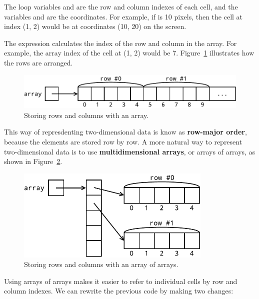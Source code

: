 The loop variables  and  are the row and column indexes of each cell, and the variables  and  are the coordinates.
For example, if  is 10 pixels, then the cell at index (1, 2) would be at coordinates (10, 20) on the screen.

The expression  calculates the index of the row and column in the array.
For example, the array index of the cell at (1, 2) would be 7.
Figure~\ref{fig:1D-array} illustrates how the rows are arranged.

\begin{figure}[!ht]
\begin{center}
\includegraphics[width=366pt]{figs/1D-array.pdf}
\caption{Storing rows and columns with an array.}
\label{fig:1D-array}
\end{center}
\end{figure}


This way of represdenting two-dimensional data is know as {\bf row-major order}, because the elements are stored row by row.
A more natural way to represent two-dimensional data is to use {\bf multidimensional arrays}, or arrays of arrays, as shown in Figure~\ref{fig:2D-array}.

\begin{figure}[!ht]
\begin{center}
\includegraphics[width=265pt]{figs/2D-array.pdf}
\caption{Storing rows and columns with an array of arrays.}
\label{fig:2D-array}
\end{center}
\end{figure}

Using arrays of arrays makes it easier to refer to individual cells by row and column indexes.
We can rewrite the previous code by making two changes:

